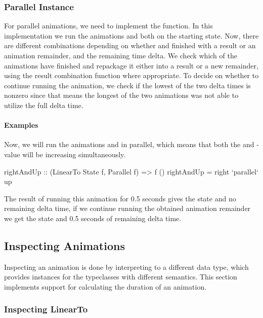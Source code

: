 \subsubsection{Parallel Instance}

For parallel animations, we need to implement the  function. In this implementation we run the animations  and  both on the starting state. Now, there are different combinations depending on whether  and  finished with a result or an animation remainder, and the remaining time delta. We check which of the animations have finished and repackage it either into a result or a new remainder, using the result combination function where appropriate. To decide on whether to continue running the animation, we check if the lowest of the two delta times is nonzero since that means the longest of the two animations was not able to utilize the full delta time.

\paragraph{Examples}

Now, we will run the animations  and  in parallel, which means that both the  and -value will be increasing simultaneously.

\begin{code}
rightAndUp :: (LinearTo State f, Parallel f) => f ()
rightAndUp = right `parallel` up
\end{code}

The result of running this animation for 0.5 seconds gives the state  and no remaining delta time, if we continue running the obtained animation remainder we get the state  and 0.5 seconds of remaining delta time.

\subsection{Inspecting Animations}

Inspecting an animation is done by interpreting \dsl{} to a different data type, which provides instances for the typeclasses with different semantics. This section implements support for calculating the duration of an animation.

\subsubsection{Inspecting LinearTo}

